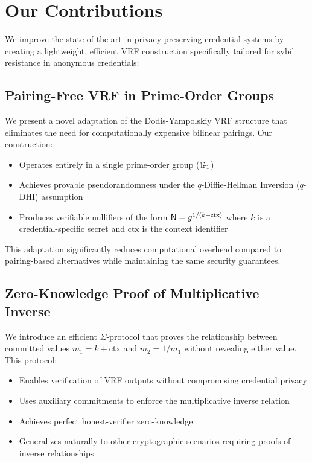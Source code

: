 \newpage

















\section{Our Contributions}

We improve the state of the art in privacy-preserving credential systems by creating a lightweight, efficient VRF construction specifically tailored for sybil resistance in anonymous credentials:

\subsection{Pairing-Free VRF in Prime-Order Groups}

We present a novel adaptation of the Dodis-Yampolskiy VRF structure that eliminates the need for computationally expensive bilinear pairings. Our construction:

\begin{itemize}
    \item Operates entirely in a single prime-order group ($\mathbb{G}_1$)
    \item Achieves provable pseudorandomness under the $q$-Diffie-Hellman Inversion ($q$-DHI) assumption
    \item Produces verifiable nullifiers of the form $\mathsf{N} = g^{1/(k+\text{ctx})}$ where $k$ is a credential-specific secret and $\text{ctx}$ is the context identifier
\end{itemize}

This adaptation significantly reduces computational overhead compared to pairing-based alternatives while maintaining the same security guarantees.

\subsection{Zero-Knowledge Proof of Multiplicative Inverse}

We introduce an efficient $\Sigma$-protocol that proves the relationship between committed values $m_1 = k+\text{ctx}$ and $m_2 = 1/m_1$ without revealing either value. This protocol:

\begin{itemize}
    \item Enables verification of VRF outputs without compromising credential privacy
    \item Uses auxiliary commitments to enforce the multiplicative inverse relation
    \item Achieves perfect honest-verifier zero-knowledge
    \item Generalizes naturally to other cryptographic scenarios requiring proofs of inverse relationships
\end{itemize}

